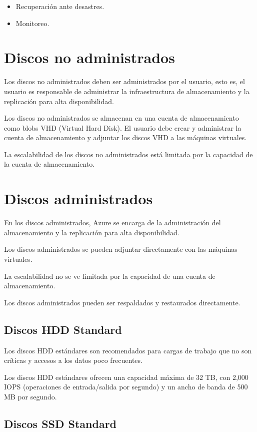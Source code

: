 \begin{itemize}
\item Recuperación ante desastres.
\item Monitoreo.
\end{itemize}

\section{Discos no administrados}

Los discos no administrados deben ser administrados por el usuario, esto es, el usuario es responsable de administrar la infraestructura de almacenamiento y la replicación para alta disponibilidad.

Los discos no administrados se almacenan en una cuenta de almacenamiento como blobs VHD (Virtual Hard Disk). El usuario debe crear y administrar la cuenta de almacenamiento y adjuntar los discos VHD a las máquinas virtuales.

La escalabilidad de los discos no administrados está limitada por la capacidad de la cuenta de almacenamiento.

\section{Discos administrados}

En los discos administrados, Azure se encarga de la administración del almacenamiento y la replicación para alta disponibilidad.

Los discos administrados se pueden adjuntar directamente con las máquinas virtuales.

La escalabilidad no se ve limitada por la capacidad de una cuenta de almacenamiento.

Los discos administrados pueden ser respaldados y restaurados directamente.

\subsection{Discos HDD Standard}

Los discos HDD estándares son recomendados para cargas de trabajo que no son críticas y accesos a los datos poco frecuentes.

Los discos HDD estándares ofrecen una capacidad máxima de 32 TB, con 2,000 IOPS (operaciones de entrada/salida por segundo) y un ancho de banda de 500 MB por segundo.

\subsection{Discos SSD Standard}

